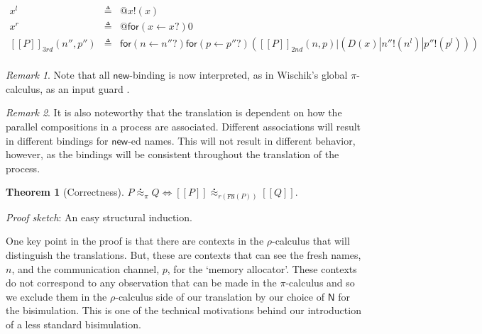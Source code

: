 \documentclass[submission,copyright,creativecommons]{eptcs}
\makeatletter
\newcommand{\pic}{$\pi$-calculus}
\newcommand{\ldb}{[\![}
\newcommand{\rdb}{]\!]}
\newcommand{\wbbisim}{\stackrel{\centerdot}{\approx}} %
\newcommand{\pzero}{\mathbin{0}}
\newcommand{\binpar}[2]{#1 | #2}
\newcommand{\outputp}[2]{#1!(#2)}
\newcommand{\prefix}[3]{\mathsf{for}(#2 \leftarrow #1?) #3}
\newcommand{\quotep}[1]{\mathsf{@}#1}
\newcommand{\meaningof}[1]{\ldb #1 \rdb}
\newcommand{\rhoc}{$\rho$-calculus}
\theoremstyle{definition}
\newtheorem{theorem}{Theorem}
\theoremstyle{remark}
\newtheorem{remark}{Remark}
\theoremstyle{remark}
\makeatother
\begin{document}
\begin{eqnarray*}
	x^{l} & \triangleq & \quotep{\outputp{x}{x}} \\
	x^{r} & \triangleq & \quotep{\prefix{x}{x}{\pzero}} \\
	\meaningof{P}_{3rd}( n'', p'' ) 
		& \triangleq & 
			\prefix{n''}{n}{\prefix{p''}{p}{(\binpar{\meaningof{P}_{2nd}(  n, p )}
							        {(\binpar{D(x)}{\binpar{\outputp{n''}{n^{l}}}{\outputp{p''}{p^{l}}}})})}} \\
\end{eqnarray*}

\begin{remark}
	Note that all $\mathsf{new}$-binding is now interpreted, as in Wischik's
	global $\pi$-calculus, as an input guard \cite{globalpi}.
\end{remark}
	
\begin{remark}
	It is also noteworthy that the translation is dependent on how
	the parallel compositions in a process are
	associated. Different associations will result in different
	bindings for $\mathsf{new}$-ed names. This will not result in different
	behavior, however, as the bindings will be consistent
	throughout the translation of the process.
\end{remark}

\begin{theorem}[Correctness]	
	$P \wbbisim_{\pi} Q \iff \ldb P \rdb \wbbisim_{r(\texttt{FN}(P))} \ldb Q \rdb$.
\end{theorem}

\emph{Proof sketch}: An easy structural induction.

One key point in the proof is that there are contexts in the {\rhoc}
that will distinguish the translations. But, these are contexts that
can see the fresh names, $n$, and the communication channel, $p$, for
the `memory allocator'. These contexts do not correspond to any
observation that can be made in the {\pic} and so we exclude them in
the {\rhoc} side of our translation by our choice of ${\mathsf N}$
for the bisimulation. This is one of the technical motivations behind
our introduction of a less standard bisimulation.
\end{document}
